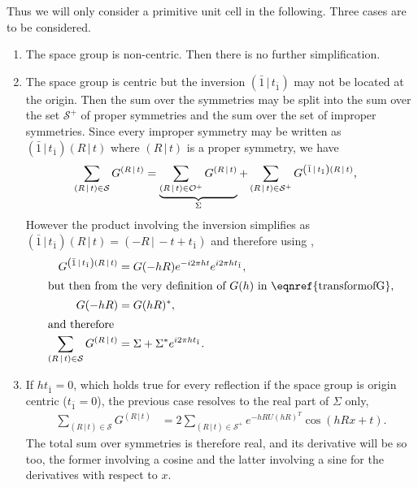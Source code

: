 \documentclass[pdf]{iucr}
\newcommand{\sym}[2]{\left( #1\,\vert\, #2 \right)}
\newcommand{\inversion}{ \sym{\bar{1}}{t_{\bar{1}}} }
\begin{document}
Thus we will only consider a primitive unit cell in the following. Three cases are to be considered.
\begin{enumerate}
\item The space group is non-centric. Then there is no further simplification.
\item The space group is centric but the inversion $\inversion$ may not be located at the origin. Then the sum over the symmetries may be split into the sum over the set $\mathcal{S}^+$ of proper symmetries and the sum over the set of  improper symmetries. Since every improper symmetry may be written as $\inversion\sym{R}{t}$ where $\sym{R}{t}$ is a proper symmetry, we have
\begin{align}
\sum_{\sym{R}{t} \in \mathcal{S}} G^{\sym{R}{t}} &= 
\underbrace{\sum_{\sym{R}{t} \in \cal{O^+}} G^{\sym{R}{t}} }_{\Sigma} 
+ \sum_{\sym{R}{t} \in \mathcal{S}^+} G^{\inversion \sym{R}{t}}, \nonumber
\end{align}
However the product involving the inversion simplifies as 
$\inversion\sym{R}{t} = \sym{-R}{-t + t_{\bar{1}}}$ and therefore using ,
\begin{align}
G^{\inversion\sym{R}{t}} &= G(-hR) e^{-i2\pi ht} e^{i2\pi h t_{\bar{1}}}, \nonumber \\
 \shortintertext{but then from the very definition of $G(h)$ in \eqnref{transformofG},}
 G(-hR) &= G(hR)^*, \\
 \shortintertext{and therefore}
 \sum_{\sym{R}{t} \in \mathcal{S}} G^{\sym{R}{t}} &= \Sigma + \Sigma^* e^{i2\pi h t_{\bar{1}}}.
 \label{eqn:sumofGforcentricgroups}
\end{align}

\item If $h t_{\bar{1}}=0$, which holds true for every reflection if the space group is origin centric ($t_{\bar{1}}=0$), the previous case resolves to the real part of $\Sigma$ only,
\begin{align}
 \sum_{\sym{R}{t} \in \mathcal{S}} G^{\sym{R}{t}} & = 2 \sum_{\sym{R}{t} \in \mathcal{S}^+}  e^{-h R U (hR)^T} \cos(hRx + t).
\end{align}
The total sum over symmetries is therefore real, and its derivative will be so too, the former involving a cosine and the latter involving a sine for the derivatives with respect to $x$. 
\end{enumerate}
\end{document}

